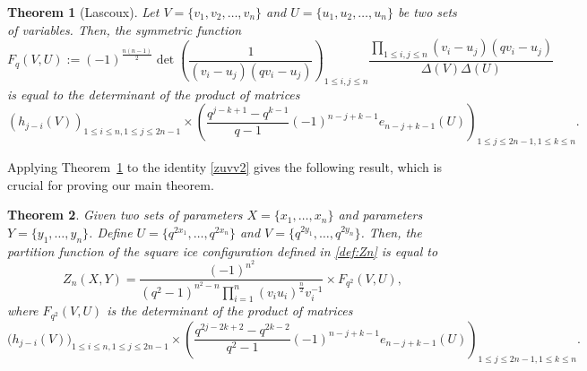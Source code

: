 \documentclass[12pt, a4paper]{amsart} %
\numberwithin{equation}{section}
\newtheorem{theorem}{Theorem}[section]
\begin{document}
\begin{theorem}[Lascoux]\label{th:lascoux} 
 Let $V = \{v_1, v_2, \dots, v_{n}\}$ and $U = \{u_1, u_2, \dots, u_{n}\}$ be two sets of variables.
Then, the symmetric function 
     $$
     F_q(V,U):=(-1)^{\frac{n(n-1)}{2}}\det{\left(\frac{1}{(v_i-u_j)(qv_i-u_j)}\right)_{1 \le i,j \le n}} \frac{\prod_{1 \leq i,j \leq n}(v_i-u_j)(qv_i-u_j)}{\Delta(V)\Delta(U)}
     $$
     is equal to the determinant of the product of matrices
   $$
     \left(h_{j-i}(V)\right)_{1\leq i \leq n, 1\leq j\leq 2n-1}
     \times
		 \left(\frac{q^{j-k+1}-q^{k-1}}{q-1}(-1)^{n-j+k-1}e_{n-j+k-1}(U)\right)_{1 \leq j \leq 2n-1, 1 \leq k \leq n}.
     $$
 \end{theorem}

Applying Theorem~\ref{th:lascoux} to the identity \eqref{zuvv2} gives the following result, which is crucial for proving our main theorem.

\begin{theorem}\label{zthuv}
Given two sets of parameters $X=\{x_1,\ldots,x_n\}$ and parameters $Y=\{y_1,\ldots,y_n\}$. 
Define $U=\{q^{2x_1}, \ldots, q^{2x_n}\}$ and $V=\{q^{2y_1}, \ldots, q^{2y_n}\}$.
Then, the partition function of the square ice configuration defined in \eqref{def:Zn} is equal to
    \begin{equation*}
        Z_n(X,Y)=\frac{(-1)^{n^2}}{(q^2-1)^{n^2-n}\prod_{i=1}^{n}(v_iu_i)^{\frac{n}{2}}v_i^{-1}}\times F_{q^2}(V,U),
    \end{equation*}
    where $F_{q^2}(V,U)$ is the determinant of the product of matrices
    \begin{equation*}
        \bigl(h_{j-i}(V)\bigr)_{1\leq i \leq n, 1\leq j \leq 2n-1} 
				\times \left(\frac{q^{2j-2k+2}-q^{2k-2}}{q^2-1}
				(-1)^{n-j+k-1}
				e_{n-j+k-1}(U)\right)_{1 \leq j \leq 2n-1, 1 \leq k \leq n}.
    \end{equation*}
\end{theorem}


\end{document}
